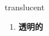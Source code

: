 
\begin{frame}
{\huge translucent}
\begin{center}
\begin{enumerate}\Large
  \item \textbf{透明的}
\end{enumerate}
\end{center}
\end{frame}
